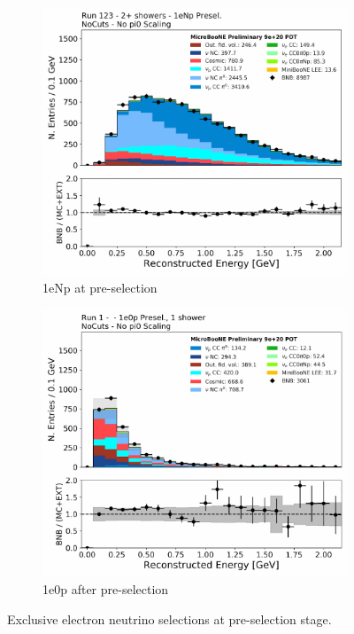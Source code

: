 \begin{figure}[H] 
\begin{center}
    \begin{subfigure}[b]{0.45\textwidth}
    \centering
    \includegraphics[width=1.00\textwidth]{Fakedata/set5/np_2shr.pdf}
    \caption{\label{fig:fakedata:set5:Np_presel_recoe} 1eNp at pre-selection}
    \end{subfigure}
    \begin{subfigure}[b]{0.45\textwidth}
    \centering
    \includegraphics[width=1.00\textwidth]{Fakedata/set5/zp_presel_recoe.pdf}
    \caption{\label{fig:fakedata:set5:2shr0p} 1e0p after pre-selection}
    \end{subfigure}
\caption{\label{fig:fakedata:set5:presel} Exclusive electron neutrino selections at pre-selection stage.}
\end{center}
\end{figure}

